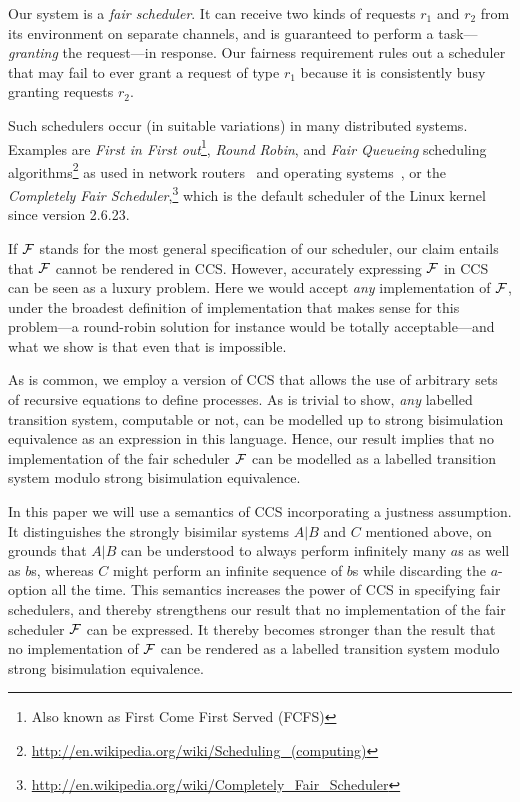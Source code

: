 \documentclass[smallcondensed]{svjour3}
\begin{document}
Our system is a \emph{fair scheduler}. It can receive two
kinds of requests $r_1$ and $r_2$ from its environment on separate channels, and is guaranteed to perform a
task---\emph{granting} the request---in response. Our fairness requirement rules out a scheduler that
may fail to ever grant a request of type $r_1$ because it is consistently busy granting requests $r_2$.

Such schedulers occur
(in suitable variations)
in many distributed systems.
Examples are \emph{First in First out}\footnote{Also known as First Come First Served (FCFS)},
\emph{Round Robin}, and
\emph{Fair Queueing} 
scheduling algorithms\footnote{\url{http://en.wikipedia.org/wiki/Scheduling_(computing)}}
as used in network routers~\cite{rfc970,Nagle87} and operating systems~\cite{Kleinrock64},
or the \emph{Completely Fair Scheduler},\footnote{\url{http://en.wikipedia.org/wiki/Completely_Fair_Scheduler}}
which is the default scheduler of the Linux kernel since version 2.6.23.

If $\cal F$ stands for the most general specification of our scheduler, our claim entails that 
$\cal F$ cannot be rendered in CCS\@. However, accurately expressing $\cal F$ in CCS can
be seen as a luxury problem. Here we would accept \emph{any} implementation of $\cal F$, under the
broadest definition of implementation that makes sense for this problem---a round-robin solution for
instance would be totally acceptable---and what we show is that even that is
impossible.

As is common, we employ a version of CCS that allows the use of arbitrary sets of recursive equations to define processes.
As is trivial to show, \emph{any} labelled transition system, computable or 
not, can be modelled up to strong bisimulation equivalence as an expression in this
language. Hence, our result implies that no implementation of the fair scheduler $\cal F$ can be modelled as
a labelled transition system modulo strong bisimulation equivalence.

In this paper we will use a semantics of CCS incorporating a justness assumption. It distinguishes the strongly bisimilar systems $A|B$
and $C$ mentioned above, on grounds that $A|B$ can be understood to always perform infinitely many
$a$s as well as $b$s, whereas $C$ might perform an infinite sequence of $b$s while discarding the
$a$-option all the time. This semantics increases the power of CCS in specifying fair schedulers,
and thereby strengthens our result that no implementation of the fair scheduler $\cal F$ can be
expressed. It thereby becomes stronger than the result that no implementation of $\cal F$ can be
rendered as a labelled transition system modulo strong bisimulation equivalence.
\end{document}
